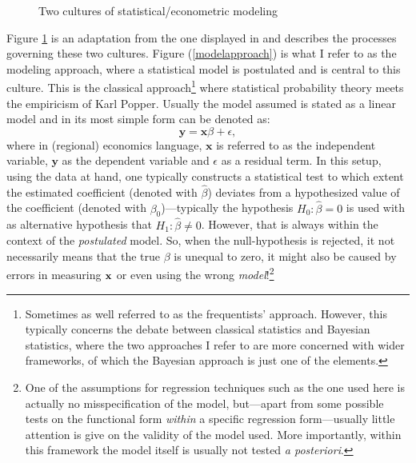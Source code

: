 \documentclass[fleqn,10pt]{SelfArx} %
\begin{document}
\begin{figure}[t!]\centering 
	\hfill
	
	\caption{Two cultures of statistical/econometric modeling \citep[inspired by][]{breiman2001statistical}}
	\label{fig:twocultures}
\end{figure}

Figure \ref{fig:twocultures} is an adaptation from the one displayed in \citet{breiman2001statistical} and describes the processes governing these two cultures. Figure (\ref{modelapproach}) is what I refer to as the modeling approach, where a statistical model is postulated and is central to this culture. This is the classical approach\footnote{Sometimes as well referred to as the frequentists' approach. However, this typically concerns the debate between classical statistics and Bayesian statistics, where the two approaches I refer to are more concerned with wider frameworks, of which the Bayesian approach is just one of the elements.} where statistical probability theory meets the empiricism of Karl Popper. Usually the model assumed is stated as a linear model and in its most simple form can be denoted as:
\begin{equation}
	\mathbf{y} = \mathbf{x}\beta + \epsilon, 
\end{equation}
where in (regional) economics language, $\mathbf{x}$ is referred to as the
independent variable, $\mathbf{y}$ as the dependent variable and $\epsilon$ as a
residual term. In this setup, using the data at hand, one typically constructs a
statistical test to which extent the estimated coefficient (denoted with
$\hat{\beta}$) deviates from a hypothesized value of the coefficient (denoted
with $\beta_0$)---typically the hypothesis $H_0: \hat{\beta} = 0$ is used with
as alternative hypothesis that $H_1: \hat{\beta} \neq 0$. However, that is
always within the context of the \textit{postulated} model. So, when the
null-hypothesis is rejected, it not necessarily means that the true $\beta$ is
unequal to zero, it might also be caused by errors in measuring $\bf{x}$ or even using the wrong \textit{model}!\footnote{One of the assumptions for regression techniques such as the one used here is actually no misspecification of the model, but---apart from some possible tests on the functional form \textit{within} a specific regression form---usually little attention is give on the validity of the model used. More importantly, within this framework the model itself is usually not tested \textit{a posteriori}.}
\end{document}
